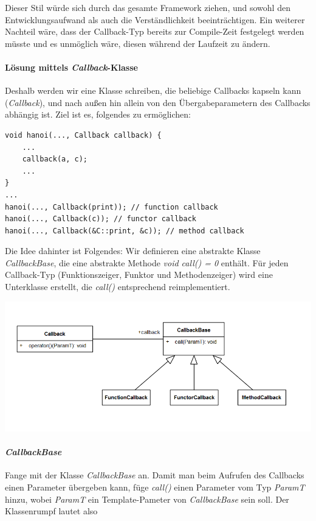 \begin{enumerate}
Dieser Stil würde sich durch das gesamte Framework ziehen, und sowohl den Entwicklungsaufwand als auch die Verständlichkeit beeinträchtigen.
Ein weiterer Nachteil wäre, dass der Callback-Typ bereits zur Compile-Zeit festgelegt werden müsste und es unmöglich wäre, diesen während der Laufzeit zu ändern.

\paragraph*{Lösung mittels \emph{Callback}-Klasse}

Deshalb werden wir eine Klasse schreiben, die beliebige Callbacks kapseln kann (\emph{Callback}), und nach außen hin allein von den Übergabeparametern des Callbacks abhängig ist. Ziel ist es, folgendes zu ermöglichen:
\begin{lstlisting}
void hanoi(..., Callback callback) {
	...
	callback(a, c);
	...
}
...
hanoi(..., Callback(print)); // function callback
hanoi(..., Callback(c)); // functor callback
hanoi(..., Callback(&C::print, &c)); // method callback
\end{lstlisting} 

Die Idee dahinter ist Folgendes:
Wir definieren eine abstrakte Klasse \emph{CallbackBase}, die eine abstrakte Methode \emph{void call() = 0} enthält.
Für jeden Callback-Typ (Funktionszeiger, Funktor und Methodenzeiger) wird eine Unterklasse erstellt, die \emph{call()} entsprechend reimplementiert.

\begin{center}
\includegraphics[width=.7\textwidth]{callback_metamodel.png}
\end{center}

\paragraph*{\emph{CallbackBase}}

Fange mit der Klasse \emph{CallbackBase} an.
Damit man beim Aufrufen des Callbacks einen Parameter übergeben kann, füge \emph{call()} einen Parameter vom Typ \emph{ParamT} hinzu, wobei \emph{ParamT} ein Template-Pameter von \emph{CallbackBase} sein soll. Der Klassenrumpf lautet also


\end{enumerate}
